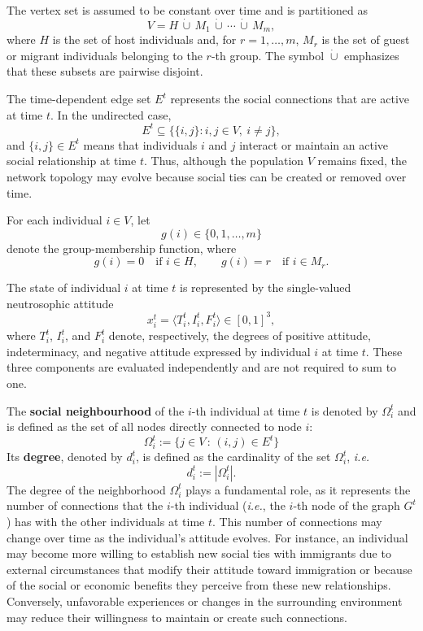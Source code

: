 \documentclass[11pt,a4paper]{article}
\newcommand{\nstriple}[1]{\langle #1 \rangle}
\begin{document}
	The vertex set is assumed to be constant over time and is partitioned as
	$$ V = H \,\dot{\cup}\, M_1 \,\dot{\cup}\, \cdots \,\dot{\cup}\, M_m,
	$$
	where $H$ is the set of host individuals and, for
	$r=1,\ldots,m$, $M_r$ is the set of guest or migrant individuals
	belonging to the $r$-th group. The symbol $\dot{\cup}$ emphasizes that these subsets are pairwise disjoint.
	
	The time-dependent edge set $E^t$ represents the social connections that are active at time $t$. In the undirected case,
	$$
	E^t
	\subseteq \bigl\{\{i,j\}:i,j\in V,\ i\neq j\bigr\},
	$$
	and $\{i,j\}\in E^t$ means that individuals $i$ and $j$ interact
	or maintain an active social relationship at time $t$. Thus, although the population $V$ remains fixed, the network topology may evolve because social ties can be created or removed over time.
	
	For each individual $i\in V$, let
	$$
	g(i) \in \{0,1,\ldots,m\}
	$$
	denote the group-membership function, where
	$$
	g(i)=0 \quad\text{if } i\in H,
	\qquad
	g(i)=r \quad\text{if } i\in M_r.
	$$
	
	The state of individual $i$ at time $t$ is represented by the
	single-valued neutrosophic attitude
	$$
	x_i^t = \nstriple{T_i^t,I_i^t,F_i^t} \in [0,1]^3,
	$$
	where $T_i^t$, $I_i^t$, and $F_i^t$ denote, respectively, the degrees of positive attitude, indeterminacy, and negative attitude expressed by individual $i$ at time $t$. These three components are evaluated independently and are not required to sum to one.
	
	The \textbf{social neighbourhood} of the $i$-th individual at time $t$ is denoted by $\Omega_i^t$ and is defined as the set of all nodes directly connected to node $i$:
	$$
	\Omega_i^t := \{j \in V \, : \, (i,j) \in E^t \}
	$$
	Its \textbf{degree}, denoted by $d_i^t$, is defined as the cardinality of the set $\Omega_i^t$, \emph{i.e.}
	$$
	d_i^t := |\Omega_i^t|.
	$$
	The degree of the neighborhood $\Omega_i^t$ plays a fundamental role, as it represents the number of connections that the $i$-th individual (\emph{i.e.}, the $i$-th node of the graph $G^t$) has with the other individuals at time $t$. This number of connections may change over time as the individual's attitude evolves. For instance, an individual may become more willing to establish new social ties with immigrants due to external circumstances that modify their attitude toward immigration or because of the social or economic benefits they perceive from these new relationships. Conversely, unfavorable experiences or changes in the surrounding environment may reduce their willingness to maintain or create such connections.
	
\end{document}
